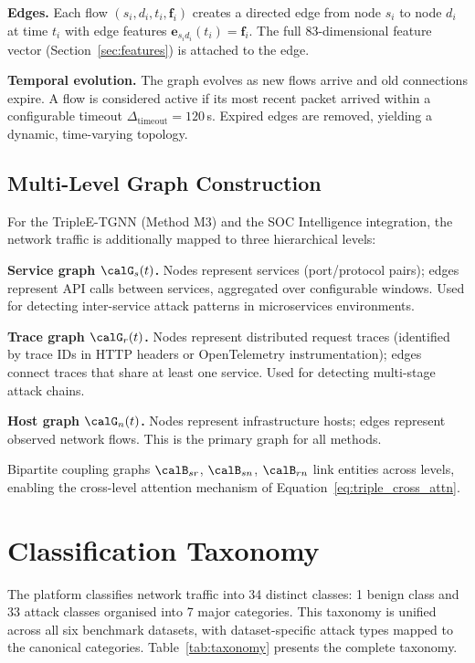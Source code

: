 \noindent\textbf{Edges.} Each flow $(s_i, d_i, t_i, \mathbf{f}_i)$ creates a directed edge from node $s_i$ to node $d_i$ at time $t_i$ with edge features $\mathbf{e}_{s_id_i}(t_i) = \mathbf{f}_i$. The full 83-dimensional feature vector (Section~\ref{sec:features}) is attached to the edge.

\noindent\textbf{Temporal evolution.} The graph evolves as new flows arrive and old connections expire. A flow is considered active if its most recent packet arrived within a configurable timeout $\Delta_{\mathrm{timeout}}=120$\,s. Expired edges are removed, yielding a dynamic, time-varying topology.

\subsection{Multi-Level Graph Construction}

For the TripleE-TGNN (Method M3) and the SOC Intelligence integration, the network traffic is additionally mapped to three hierarchical levels:

\noindent\textbf{Service graph $\calG_s(t)$.} Nodes represent services (port/protocol pairs); edges represent API calls between services, aggregated over configurable windows. Used for detecting inter-service attack patterns in microservices environments.

\noindent\textbf{Trace graph $\calG_r(t)$.} Nodes represent distributed request traces (identified by trace IDs in HTTP headers or OpenTelemetry instrumentation); edges connect traces that share at least one service. Used for detecting multi-stage attack chains.

\noindent\textbf{Host graph $\calG_n(t)$.} Nodes represent infrastructure hosts; edges represent observed network flows. This is the primary graph for all methods.

\noindent Bipartite coupling graphs $\calB_{sr}$, $\calB_{sn}$, $\calB_{rn}$ link entities across levels, enabling the cross-level attention mechanism of Equation~\eqref{eq:triple_cross_attn}.


\section{Classification Taxonomy}
\label{sec:taxonomy}

The platform classifies network traffic into 34 distinct classes: 1 benign class and 33 attack classes organised into 7 major categories. This taxonomy is unified across all six benchmark datasets, with dataset-specific attack types mapped to the canonical categories. Table~\ref{tab:taxonomy} presents the complete taxonomy.

